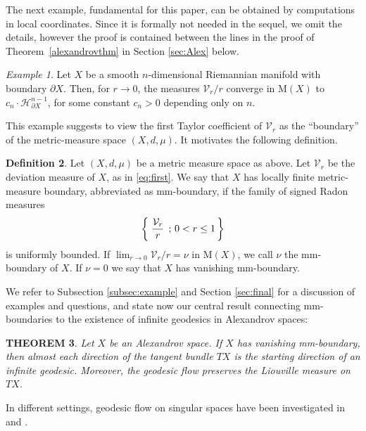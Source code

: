 \documentclass[12pt,leqno,intlimits]{amsart}
\numberwithin{equation}{section}
\newtheorem{thm}{THEOREM}[section]
\theoremstyle{definition}
\newtheorem{defn}[thm]{Definition}%
\theoremstyle{remark}
\newtheorem{ex}[thm]{Example}
\newcommand{\tref}[1]{Theorem~\ref{#1}}
\newcommand*{\set}[2]{\left\{\,\left.{#1}\vphantom{#2}\,\right.;\,{#2}\,\right\}}
\begin{document}
 {\color {green}
The next example, fundamental for this paper,  can be obtained by computations in local coordinates.
Since it is formally not needed in the sequel, we omit
the details, however the proof is contained between the lines in the proof of \tref{alexandrovthm} in Section \ref{sec:Alex} below.}
 

\begin{ex} \label{mainex}
Let $X$ be a smooth $n$-dimensional Riemannian manifold with boundary $\partial X$.
Then, for $r\to 0$, the measures $\mathcal{V}_r/r$ converge in $\mathrm M(X)$ to
$c_n \cdot \mathcal H^{n-1} _{\partial X}$, for some constant $c_n >0$ depending only on $n$.
\end{ex}

This example suggests to view the first Taylor coefficient of $\mathcal{V}_r$ as the ``boundary'' of the metric-measure space $(X, d, \mu)$.
It motivates the following definition.

\begin{defn} \label{def:first}
Let $(X,d,\mu)$ be a metric measure space as above. Let $\mathcal{V}_r$ be the deviation measure of $X$, as in \eqref{eq:first}.
We say that $X$ has locally finite metric-measure boundary, abbreviated as mm-boundary,
if the family of signed Radon measures
\[\set{\frac { \mathcal{V}_r } {r }}{0<r\leq 1}\]
is uniformly bounded.
If $\lim _{r\to 0} \mathcal{V}_r /r =\nu $ in $\mathrm M(X)$, we call $\nu$ the mm-boundary of $X$. If $\nu =0$ we say that $X$ has vanishing mm-boundary.
\end{defn}

We refer to Subsection \ref{subsec:example} and Section \ref{sec:final} for a discussion of examples and questions, and
state now our central result connecting mm-boundaries to the existence of infinite geodesics in Alexandrov spaces:

\begin{thm} \label{thmmain}
Let $X$ be an Alexandrov space.
If $X$ has vanishing mm-boundary, then almost each direction of the tangent
bundle $TX$ is the starting direction of an infinite geodesic.
Moreover, the geodesic flow preserves the Liouville measure on $TX$.
\end{thm}

In different settings, geodesic flow on singular spaces have been investigated in \cite{BallmannBrin} and \cite{Bamler}.
\end{document}
